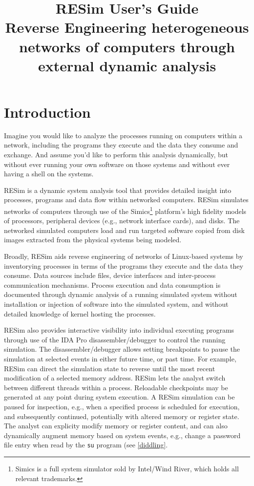 \documentclass[titlepage]{article}
\begin{document}
\title {%
  RESim User's Guide \\
  \large Reverse Engineering heterogeneous networks of computers
   through external dynamic analysis}
\maketitle
\tableofcontents
\newpage

\section{Introduction}
Imagine you would like to analyze the processes running on computers within a network, including the programs they execute and the data they consume and exchange.   And assume you’d like to perform this analysis dynamically, but without ever running your own software on those systems and without ever having a shell on the systems.

RESim is a dynamic system analysis tool that provides detailed insight into processes, programs and data flow within networked computers.  RESim simulates networks of computers through use of the Simics\footnote{ Simics is a full system simulator sold by Intel/Wind River, which holds all relevant trademarks.} 
platform's high fidelity models of processors, peripheral devices (e.g., network interface cards), and disks.  The networked simulated computers load and run targeted software copied from disk images extracted from the physical systems being modeled.

Broadly, RESim aids reverse engineering of networks of Linux-based systems by inventorying processes in terms of the programs they execute and the data they consume.  Data sources include files, device interfaces and inter-process communication mechanisms.   Process execution and data consumption is documented through dynamic analysis of a running simulated system without installation or injection of software into the simulated system, and without detailed knowledge of kernel hosting the processes.

RESim also provides interactive visibility into individual executing programs through use of the IDA Pro
disassembler/debugger to control the running simulation.  The disassembler/debugger
allows setting breakpoints to pause the simulation at selected events in either future time, or past time.  For 
example, RESim can direct the simulation state to reverse until the most recent modification of a selected memory address.   RESim lets the analyst switch between different threads within a process.  Reloadable checkpoints may be generated at any point during system execution.  
A RESim simulation can be paused for inspection, e.g., when a specified process is scheduled for execution, and subsequently continued, potentially with altered memory or register state.  The analyst can explicity modify memory or register content, and can also dynamically augment memory 
based on system events, e.g., change a password file entry when read by the {\tt su} program (see \ref{diddling}.
\end{document}
